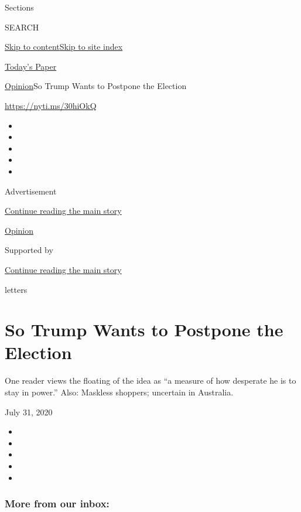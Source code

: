 Sections

SEARCH

\protect\hyperlink{site-content}{Skip to
content}\protect\hyperlink{site-index}{Skip to site index}

\href{https://myaccount.nytimes.com/auth/login?response_type=cookie\&client_id=vi}{}

\href{https://www.nytimes.com/section/todayspaper}{Today's Paper}

\href{/section/opinion}{Opinion}\textbar{}So Trump Wants to Postpone the
Election

\url{https://nyti.ms/30hiOkQ}

\begin{itemize}
\item
\item
\item
\item
\item
\end{itemize}

Advertisement

\protect\hyperlink{after-top}{Continue reading the main story}

\href{/section/opinion}{Opinion}

Supported by

\protect\hyperlink{after-sponsor}{Continue reading the main story}

letters

\hypertarget{so-trump-wants-to-postpone-the-election}{%
\section{So Trump Wants to Postpone the
Election}\label{so-trump-wants-to-postpone-the-election}}

One reader views the floating of the idea as ``a measure of how
desperate he is to stay in power.'' Also: Maskless shoppers; uncertain
in Australia.

July 31, 2020

\begin{itemize}
\item
\item
\item
\item
\item
\end{itemize}

\hypertarget{more-from-our-inbox}{%
\subsubsection{More from our inbox:}\label{more-from-our-inbox}}

